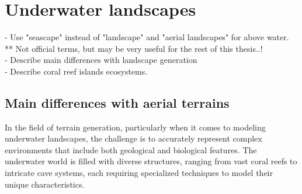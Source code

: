 







\section{Underwater landscapes}
- Use "seascape" instead of "landscape" and "aerial landscapes" for above water. \\
** Not official terms, but may be very useful for the rest of this thesis..! \\
- Describe main differences with landscape generation \\
- Describe coral reef islands ecosystems.

\subsection{Main differences with aerial terrains}
In the field of terrain generation, particularly when it comes to modeling underwater landscapes, the challenge is to accurately represent complex environments that include both geological and biological features. The underwater world is filled with diverse structures, ranging from vast coral reefs to intricate cave systems, each requiring specialized techniques to model their unique characteristics.


